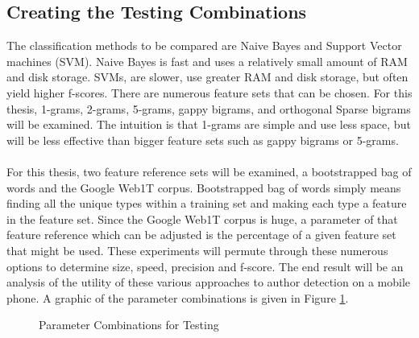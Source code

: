 	\subsection{Creating the Testing Combinations} The classification methods to be compared are Naive Bayes and Support Vector machines (SVM). Naive Bayes is fast and uses a relatively small amount of RAM and disk storage. SVMs, are slower, use greater RAM and disk storage, but often yield higher f-scores.  There are numerous feature sets that can be chosen.  For this thesis, 1-grams, 2-grams, 5-grams, gappy bigrams, and orthogonal Sparse bigrams will be examined.  The intuition is that 1-grams are simple and use less space, but will be less effective than bigger feature sets such as gappy bigrams or 5-grams.
	\paragraph{} For this thesis, two feature reference sets will be examined, a bootstrapped bag of words and the Google Web1T corpus.  Bootstrapped bag of words simply means finding all the unique types within a training set and making each type a feature in the feature set. Since the Google Web1T corpus is huge, a parameter of that feature reference which can be adjusted is the percentage of a given feature set that might be used.  These experiments will permute through these numerous options to determine size, speed, precision and f-score.  The end result will be an analysis of the utility of these various approaches to author detection on a mobile phone.  A graphic of the parameter combinations is given in Figure \ref{fig:parameterCombinations}.   
	
	\begin{figure}[h!]
		\begin{center}
			\caption{Parameter Combinations for Testing}
			\label{fig:parameterCombinations}
		\end{center}
	\end{figure}
	
